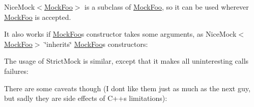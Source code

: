 \begin{DoxyCode}{0}
\DoxyCodeLine{}
\DoxyCodeLine{\}}
\end{DoxyCode}


{\ttfamily Nice\+Mock$<$\mbox{\hyperlink{class_mock_foo}{Mock\+Foo}}$>$} is a subclass of {\ttfamily \mbox{\hyperlink{class_mock_foo}{Mock\+Foo}}}, so it can be used wherever {\ttfamily \mbox{\hyperlink{class_mock_foo}{Mock\+Foo}}} is accepted.

It also works if {\ttfamily \mbox{\hyperlink{class_mock_foo}{Mock\+Foo}}}\textquotesingle{}s constructor takes some arguments, as {\ttfamily Nice\+Mock$<$\mbox{\hyperlink{class_mock_foo}{Mock\+Foo}}$>$} \char`\"{}inherits\char`\"{} {\ttfamily \mbox{\hyperlink{class_mock_foo}{Mock\+Foo}}}\textquotesingle{}s constructors\+:


\begin{DoxyCode}{0}
\DoxyCodeLine{}
\DoxyCodeLine{\}}
\end{DoxyCode}


The usage of {\ttfamily Strict\+Mock} is similar, except that it makes all uninteresting calls failures\+:


\begin{DoxyCode}{0}
\DoxyCodeLine{}
\DoxyCodeLine{}
\DoxyCodeLine{\}}
\end{DoxyCode}


There are some caveats though (I don\textquotesingle{}t like them just as much as the next guy, but sadly they are side effects of C++\textquotesingle{}s limitations)\+:


